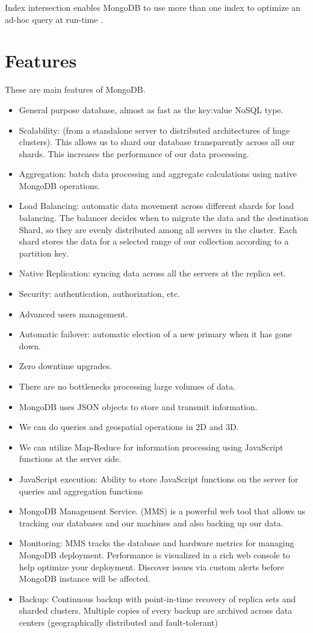 \documentclass[9pt,twocolumn,twoside]{../../styles/osajnl}
\begin{document}
Index intersection enables MongoDB to use more than one index to optimize an ad-hoc query at run-time \cite{www-mongo5}.
    
\section{Features}

These are main features of MongoDB.\cite{www-mongo11}
\begin{itemize}
\item General purpose database, almost as fast as the key:value NoSQL type.
\item Scalability: (from a standalone server to distributed
  architectures of huge clusters). This allows us to shard our
  database transparently across all our shards. This increases the
  performance of our data processing.
\item Aggregation: batch data processing and aggregate calculations
  using native MongoDB operations.
\item Load Balancing: automatic data movement across different shards
  for load balancing. The balancer decides when to migrate the data
  and the destination Shard, so they are evenly distributed among all
  servers in the cluster. Each shard stores the data for a selected
  range of our collection according to a partition key.
\item Native Replication: syncing data across all the servers at the
  replica set.
\item Security: authentication, authorization, etc.
\item Advanced users management.
\item Automatic failover: automatic election of a new primary when it
  has gone down.
\item Zero downtime upgrades.
\item There are no bottlenecks processing large volumes of data.
\item MongoDB uses JSON objects to store and transmit information.
\item We can do queries and geospatial operations in 2D and 3D.
\item We can utilize Map-Reduce for information processing using
  JavaScript functions at the server side.
\item JavaScript execution: Ability to store JavaScript functions on
  the server for queries and aggregation functions
\item MongoDB Management Service. (MMS) is a powerful web tool that
  allows us tracking our databases and our machines and also backing
  up our data.
\item Monitoring: MMS tracks the database and hardware metrics for managing MongoDB deployment. Performance is visualized in a rich web console to help optimize your deployment. Discover issues via custom alerts before MongoDB instance will be affected.
\item Backup: Continuous backup with point-in-time recovery of replica sets and sharded clusters. Multiple copies of every backup are archived across data centers (geographically distributed and fault-tolerant)

\end{itemize}
\end{document}
